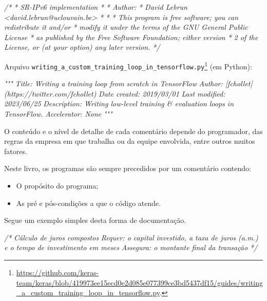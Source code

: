 \documentclass[
  11pt,
  a4paper,
]{scrbook}
\newenvironment{Shaded}{\begin{snugshade}}{\end{snugshade}}
\newcommand{\CommentTok}[1]{\textcolor[rgb]{0.56,0.35,0.01}{\textit{#1}}}
\providecommand{\tightlist}{%
  \setlength{\itemsep}{0pt}\setlength{\parskip}{0pt}}\usepackage{longtable,booktabs,array}
\begin{document}
\begin{Shaded}
\begin{Highlighting}[]
\CommentTok{/*}
\CommentTok{ *  SR{-}IPv6 implementation}
\CommentTok{ *}
\CommentTok{ *  Author:}
\CommentTok{ *  David Lebrun \textless{}david.lebrun@uclouvain.be\textgreater{}}
\CommentTok{ *}
\CommentTok{ *}
\CommentTok{ *  This program is free software; you can redistribute it and/or}
\CommentTok{ *    modify it under the terms of the GNU General Public License}
\CommentTok{ *    as published by the Free Software Foundation; either version}
\CommentTok{ *    2 of the License, or (at your option) any later version.}
\CommentTok{ */}
\end{Highlighting}
\end{Shaded}

Arquivo
\texttt{writing\_a\_custom\_training\_loop\_in\_tensorflow.py}\footnote{\url{https://github.com/keras-team/keras/blob/419973ee15ecd0e2d085e077399ce3bd5437df15/guides/writing_a_custom_training_loop_in_tensorflow.py}.}
(em Python):

\begin{Shaded}
\begin{Highlighting}[]
\CommentTok{"""}
\CommentTok{Title: Writing a training loop from scratch in TensorFlow}
\CommentTok{Author: [fchollet](https://twitter.com/fchollet)}
\CommentTok{Date created: 2019/03/01}
\CommentTok{Last modified: 2023/06/25}
\CommentTok{Description: Writing low{-}level training \& evaluation loops in TensorFlow.}
\CommentTok{Accelerator: None}
\CommentTok{"""}
\end{Highlighting}
\end{Shaded}

O conteúdo e o nível de detalhe de cada comentário depende do
programador, das regras da empresa em que trabalha ou da equipe
envolvida, entre outros muitos fatores.

Neste livro, os programas são sempre precedidos por um comentário
contendo:

\begin{itemize}
\tightlist
\item
  O propósito do programa;
\item
  As pré e pós-condições a que o código atende.
\end{itemize}

Segue um exemplo simples desta forma de documentação.

\begin{Shaded}
\begin{Highlighting}[]
\CommentTok{/*}
\CommentTok{Cálculo de juros compostos}
\CommentTok{Requer: o capital investido, a taxa de juros (a.m.) e o tempo}
\CommentTok{    de investimento em meses}
\CommentTok{Assegura: o montante final da transação}
\CommentTok{*/}
\end{Highlighting}
\end{Shaded}
\end{document}
